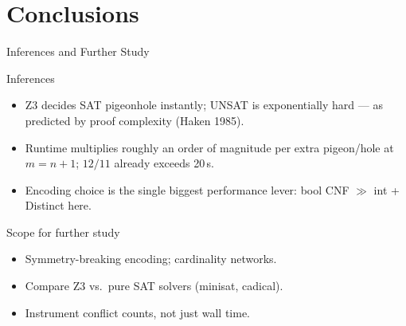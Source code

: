 \documentclass[10pt,aspectratio=169,xcolor={table}]{beamer}
\begin{document}
\section{Conclusions}

\begin{frame}{Inferences and Further Study}
  \begin{block}{Inferences}
    \begin{itemize}\itemsep2pt
      \item Z3 decides SAT pigeonhole instantly; UNSAT is
            exponentially hard --- as predicted by proof
            complexity (Haken 1985).
      \item Runtime multiplies roughly an order of magnitude per
            extra pigeon/hole at $m=n+1$; $12/11$ already exceeds
            20\,s.
      \item Encoding choice is the single biggest performance
            lever: bool CNF $\gg$ int + Distinct here.
    \end{itemize}
  \end{block}
  \begin{block}{Scope for further study}
    \begin{itemize}\itemsep2pt
      \item Symmetry-breaking encoding; cardinality networks.
      \item Compare Z3 vs.\ pure SAT solvers (minisat, cadical).
      \item Instrument conflict counts, not just wall time.
    \end{itemize}
  \end{block}
\end{frame}
\end{document}
